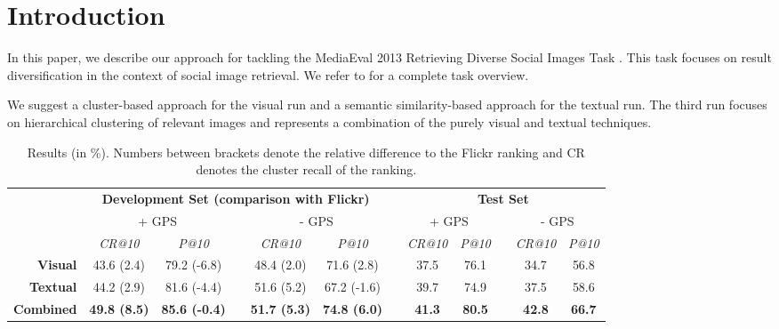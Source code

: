 \documentclass{acm_proc_article-me11_tweaked}
\begin{document}
\section{Introduction}
In this paper, we describe our approach for tackling the MediaEval 2013 Retrieving Diverse Social Images Task \cite{mediaeval-diversephotos}.
This task focuses on result diversification in the context of social image retrieval. We refer to \cite{mediaeval-diversephotos} for a complete task overview.

We suggest a cluster-based approach for the visual run and a semantic similarity-based approach for the textual run.
The third run focuses on hierarchical clustering of relevant images and represents a combination of the purely visual and textual techniques.


\begin{table*}[t]
\centering
\caption{Results (in \%). Numbers between brackets denote the relative difference to the Flickr ranking and CR denotes the cluster recall of the ranking.}
 \begin{tabular}{|r|c|ccc|ccc|ccc|c|}
\cline{2-12}
   \multicolumn{1}{c|}{ } & \multicolumn{5}{c}{\bfseries Development Set (comparison with Flickr)}  & \vrule height2.75ex depth1.25ex width 1pt &  \multicolumn{5}{c|}{\bfseries Test Set} \\\cline{2-12}    
   \multicolumn{1}{c|}{ } & \multicolumn{2}{c}{ + GPS}  & \vrule height2.75ex depth1.25ex width 1pt & \multicolumn{2}{c}{ - GPS} & \vrule height2.75ex depth1.25ex width 1pt & \multicolumn{2}{c}{ + GPS}  & \vrule height2.75ex depth1.25ex width 1pt & \multicolumn{2}{c|}{ - GPS} \\\cline{2-12}
   \multicolumn{1}{c|}{ } &  \textit{CR@10} &   \textit{P@10} & \vrule height2.75ex depth1.25ex width 1pt &  \textit{CR@10} &  \textit{P@10} & \vrule height2.75ex depth1.25ex width 1pt &  \textit{CR@10} &   \textit{P@10} & \vrule height2.75ex depth1.25ex width 1pt &   \textit{CR@10} & \textit{P@10} \\
   \hline
   \bfseries Visual   & 43.6  (2.4) & 79.2 (-6.8) & \vrule height2.75ex depth1.25ex width 1pt & 48.4 (2.0)&  71.6 (2.8)& \vrule height2.75ex depth1.25ex width 1pt & 37.5 & 76.1 & \vrule height2.75ex depth1.25ex width 1pt & 34.7 & 56.8\\\hline
  \bfseries Textual  &  44.2  (2.9)  & 81.6 (-4.4) & \vrule height2.75ex depth1.25ex width 1pt & 51.6 (5.2) & 67.2 (-1.6)& \vrule height2.75ex depth1.25ex width 1pt &  39.7  & 74.9 & \vrule height2.75ex depth1.25ex width 1pt & 37.5 & 58.6\\\hline
  \bfseries Combined & \bfseries 49.8  (8.5) & \bfseries 85.6 (-0.4) & \vrule height2.75ex depth1.25ex width 1pt & \bfseries  51.7 (5.3)  & \bfseries 74.8  (6.0)& \vrule height2.75ex depth1.25ex width 1pt  & \bfseries 41.3 & \bfseries 80.5 & \vrule height2.75ex depth1.25ex width 1pt & \bfseries  42.8  & \bfseries 66.7 \\
    \hline
  \end{tabular}
  \label{tbl:results}  
\end{table*} 
\end{document}
